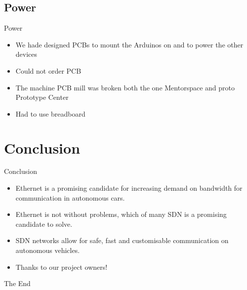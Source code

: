 \documentclass{beamer}
\begin{document}
\subsection{Power}
\begin{frame}{Power}
    \begin{itemize}
        \item We hade designed PCBs to mount the Arduinos on and to power the other devices
        \item Could not order PCB
        \item The machine PCB mill was broken both the one Mentorspace and proto Prototype Center
        \item Had to use breadboard 
    \end{itemize}
\end{frame}







\section{Conclusion}
\begin{frame}{Conclusion}
    \begin{itemize}
        \item Ethernet is a promising candidate for increasing demand on bandwidth for communication in autonomous cars.
        \item Ethernet is not without problems, which of many SDN is a promising candidate to solve.
        \item SDN networks allow for safe, fast and customisable communication on autonomous vehicles.
        \item Thanks to our project owners! 
    \end{itemize}
    
\end{frame}






\begin{frame}
\Huge{\centerline{The End}}
\end{frame}

\end{document}
